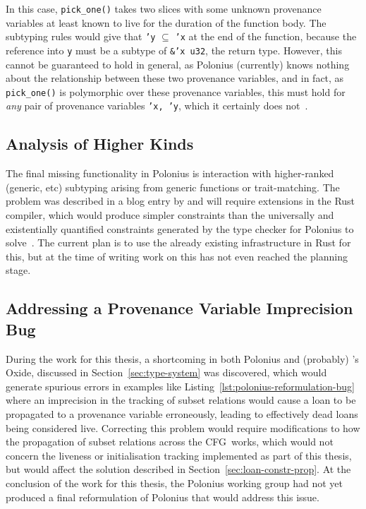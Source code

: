\documentclass[11pt,a4paper,twoside,openany]{report}
\newcommand{\InRust}[1]{\texttt{#1}}
\begin{document}
In this case, \InRust{pick_one()} takes two slices with some unknown provenance
variables at least known to live for the duration of the function body. The
subtyping rules would give that \InRust{'y} $\subseteq$ \InRust{'x} at the end
of the function, because the reference into \InRust{y} must be a subtype of
\InRust{&'x u32}, the return type. However, this cannot be guaranteed to hold in
general, as Polonius (currently) knows nothing about the relationship between
these two provenance variables, and in fact, as \InRust{pick_one()} is
polymorphic over these provenance variables, this must hold for \emph{any} pair
of provenance variables \InRust{'x, 'y}, which it certainly does
not~\cite{matsakis_polonius_2019-1}.

\subsection{Analysis of Higher Kinds}
\label{sec:missing-features:higher-kinds}

The final missing functionality in Polonius is interaction with higher-ranked
(generic, etc) subtyping arising from generic functions or trait-matching. The
problem was described in a blog entry by \citeauthor*{matsakis_polonius_2019} and
will require extensions in the Rust compiler, which would produce simpler
constraints than the universally and existentially quantified constraints
generated by the type checker for Polonius to
solve~\cite{matsakis_polonius_2019}. The current plan is to use the already
existing infrastructure in Rust for this, but at the time of writing work on
this has not even reached the planning stage.

\subsection{Addressing a Provenance Variable Imprecision Bug}
\label{sec:missing-features:provenance-variable-equality}

During the work for this thesis, a shortcoming in both Polonius and (probably)
\citeauthor*{weiss_oxide:_2019}'s Oxide, discussed in
Section~\ref{sec:type-system} was discovered, which would generate spurious
errors in examples like Listing~\ref{lst:polonius-reformulation-bug} where an
imprecision in the tracking of subset relations would cause a loan to be
propagated to a provenance variable erroneously, leading to effectively dead
loans being considered live. Correcting this problem would require modifications
to how the propagation of subset relations across the CFG~works, which would not
concern the liveness or initialisation tracking implemented as part of this
thesis, but would affect the solution described in
Section~\ref{sec:loan-constr-prop}. At the conclusion of the work for this
thesis, the Polonius working group had not yet produced a final reformulation of
Polonius that would address this issue.
\end{document}
